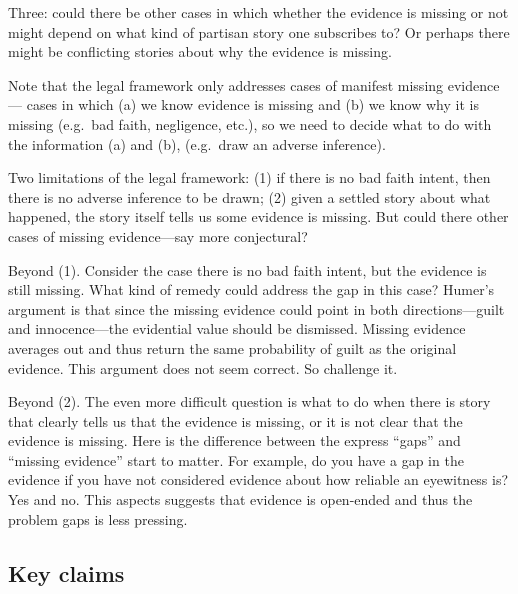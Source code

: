 \documentclass[
  10pt,
  dvipsnames,enabledeprecatedfontcommands]{scrartcl}
\begin{document}
Three: could there be other cases in which whether the evidence is
missing or not might depend on what kind of partisan story one
subscribes to? Or perhaps there might be conflicting stories about why
the evidence is missing.

Note that the legal framework only addresses cases of manifest missing
evidence --- cases in which (a) we know evidence is missing and (b) we
know why it is missing (e.g.~bad faith, negligence, etc.), so we need to
decide what to do with the information (a) and (b), (e.g.~draw an
adverse inference).

Two limitations of the legal framework: (1) if there is no bad faith
intent, then there is no adverse inference to be drawn; (2) given a
settled story about what happened, the story itself tells us some
evidence is missing. But could there other cases of missing
evidence---say more conjectural?

Beyond (1). Consider the case there is no bad faith intent, but the
evidence is still missing. What kind of remedy could address the gap in
this case? Humer's argument is that since the missing evidence could
point in both directions---guilt and innocence---the evidential value
should be dismissed. Missing evidence averages out and thus return the
same probability of guilt as the original evidence. This argument does
not seem correct. So challenge it.

Beyond (2). The even more difficult question is what to do when there is
story that clearly tells us that the evidence is missing, or it is not
clear that the evidence is missing. Here is the difference between the
express ``gaps'' and ``missing evidence'' start to matter. For example,
do you have a gap in the evidence if you have not considered evidence
about how reliable an eyewitness is? Yes and no. This aspects suggests
that evidence is open-ended and thus the problem gaps is less pressing.

\hypertarget{key-claims}{%
\subsection{Key claims}\label{key-claims}}
\end{document}
